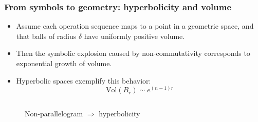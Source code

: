 \documentclass[aspectratio=169]{beamer}
\begin{document}
\begin{frame}
    \frametitle{From symbols to geometry: hyperbolicity and volume}
    \begin{itemize}
        \item Assume each operation sequence maps to a point in a geometric space, and that balls of radius $\delta$ have uniformly positive volume.
        \item Then the symbolic explosion caused by non-commutativity corresponds to exponential growth of volume.
        \item Hyperbolic spaces exemplify this behavior:
        \[
            \mathrm{Vol}(B_r) \sim e^{(n-1)r}
        \]
    \end{itemize}
    \begin{columns}
        \begin{column}{0.3\textwidth}
            \begin{figure}[ht]\centering
                \caption{Non-parallelogram $\Rightarrow$ hyperbolicity}
            \end{figure}
        \end{column}
        \begin{column}{0.3\textwidth}
            \begin{figure}[ht]\centering

\end{figure}
\end{column}
\end{columns}
\end{frame}
\end{document}

